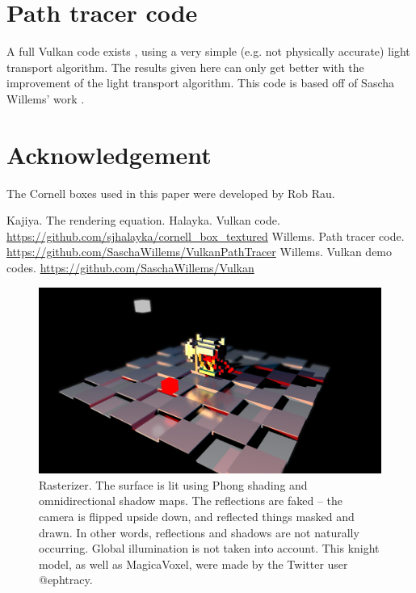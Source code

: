 \documentclass[12pt]{article}
\begin{document}
\section{Path tracer code}
A full Vulkan code exists \cite{halayka}, using a very simple (e.g. not physically accurate) light transport algorithm.
The results given here can only get better with the improvement of the light transport algorithm.
This code is based off of Sascha Willems' work \cite{willems1, willems2}.



\section{Acknowledgement}

The Cornell boxes used in this paper were developed by Rob Rau.






\begin{thebibliography}{9}

 Kajiya. The rendering equation.
 Halayka. Vulkan code. \url{https://github.com/sjhalayka/cornell_box_textured}
 Willems. Path tracer code. \url{https://github.com/SaschaWillems/VulkanPathTracer}
 Willems. Vulkan demo codes. \url{https://github.com/SaschaWillems/Vulkan}


\end{thebibliography}


\pagebreak




\begin{figure} 
\centering
  \includegraphics[width = 6 in]{rasterizer.png}
  \caption{ Rasterizer.
The surface is lit using Phong shading and omnidirectional shadow maps.
The reflections are faked -- the camera is flipped upside down, and reflected things masked and drawn.
In other words, reflections and shadows are not naturally occurring.
Global illumination is not taken into account.
This knight model, as well as MagicaVoxel, were made by the Twitter user @ephtracy.
}

\end{figure}
\end{document}
